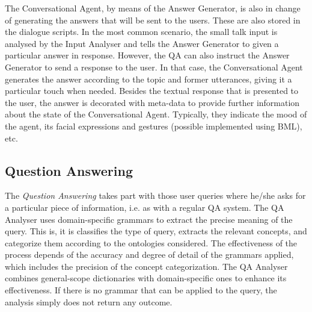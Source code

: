 The Conversational Agent, by means of the Answer Generator, is also in change of generating the answers that will be sent to the users. These are also stored in the dialogue scripts. 
In the most common scenario, the small talk input is analysed by the Input Analyser and tells the Answer Generator to given a particular answer in response.
However, the \ac{QA} can also instruct the Answer Generator to send a response to the user.
In that case, the Conversational Agent generates the answer according to the topic and former utterances, giving it a particular touch when needed.
Besides the textual response that is presented to the user, the answer is decorated with meta-data to provide further information about the state of the Conversational Agent. Typically, they indicate the mood of the agent, its facial expressions and gestures (possible implemented using \ac{BML}), etc.


\subsection{Question Answering}

The {\em Question Answering} takes part with those user queries where he/she asks for a particular piece of information, i.e. as with a regular \ac{QA} system. 
The QA Analyser uses domain-specific grammars to extract the precise meaning of the query.
This is, it is classifies the type of query, extracts the relevant concepts, and categorize them according to the ontologies considered. The effectiveness of the process depends of the accuracy and degree of detail of the grammars applied, which includes the precision of the concept categorization. The QA Analyser combines general-scope dictionaries with domain-specific ones to enhance its effectiveness. If there is no grammar that can be applied to the query, the analysis simply does not return any outcome.

